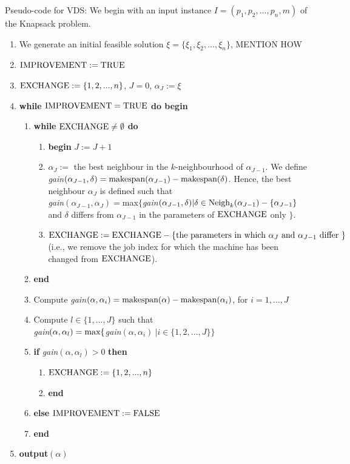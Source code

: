 \documentclass[12pt,a4paper,reqno]{article}
\begin{document}
Pseudo-code for VDS:
We begin with an input instance $I = (p_1,p_2,...,p_n,m)$ of the Knapsack problem.
\begin{enumerate}
\item We generate an initial feasible solution $\xi = \{\xi_1,\xi_2,...,\xi_n\}$, \color{red} MENTION HOW \color{black}
\item $\textnormal{IMPROVEMENT} := \textnormal{TRUE}$
\item $\textnormal{EXCHANGE} := \{1,2,...,n\}$, $J=0$, $\alpha_J := \xi$
\item \textbf{while} $\textnormal{IMPROVEMENT} = \textnormal{TRUE}$ \textbf{do begin}
\begin{enumerate}
\item \textbf{while} $\textnormal{EXCHANGE} \neq \emptyset$ \textbf{do}
\begin{enumerate}
\item \textbf{begin} $J := J+1$
\item $\alpha_J := $ the best neighbour in the $k$-neighbourhood of $\alpha_{J-1}$. We define \textit{gain}$(\alpha_{J-1}, \delta) = \textnormal{makespan}(\alpha_{J-1}) - \textnormal{makespan}(\delta)$. Hence, the best neighbour $\alpha_J$ is defined such that \\ \textit{gain}$(\alpha_{J-1},\alpha_J) = $max$\{$\textit{gain}$(\alpha_{J-1},\delta) | \delta \in \textnormal{Neigh}_k(\alpha_{J-1}) - \{\alpha_{J-1} \}$ and $\delta$ differs from $\alpha_{J-1}$ in the parameters of $\textnormal{EXCHANGE}$ only $\}$.
\item $\textnormal{EXCHANGE} := \textnormal{EXCHANGE} - \{ \textnormal{the parameters in which } \alpha_J \textnormal{ and } \alpha_{J-1} \textnormal{ differ } \}$ (i.e., we remove the job index for which the machine has been changed from $\textnormal{EXCHANGE}$).
\end{enumerate}
\item \textbf{end}
\item Compute \textit{gain}$(\alpha,\alpha_i) = \textnormal{makespan}(\alpha) - \textnormal{makespan}(\alpha_i)$, for $i=1,...,J$
\item Compute $l \in \{1,...,J\}$ such that \\ \textit{gain}$(\alpha,\alpha_l) = \textnormal{max}\{$\textit{gain}$(\alpha,\alpha_i) \> | i \in \{1,2,...,J\} \}$
\item \textbf{if} \textit{gain}$(\alpha,\alpha_l) > 0$ \textbf{then}
\begin{enumerate}
\item $\textnormal{EXCHANGE} := \{1,2,...,n\}$
\item \textbf{end}
\end{enumerate}
\item \textbf{else} $\textnormal{IMPROVEMENT} := \textnormal{FALSE}$
\item \textbf{end}
\end{enumerate}
\item \textbf{output}$(\alpha)$
\end{enumerate}
\end{document}
